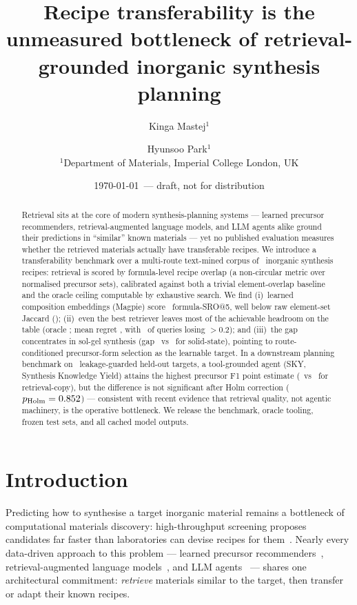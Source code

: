 \documentclass[10pt]{article}
\title{Recipe transferability is the unmeasured bottleneck of
retrieval-grounded inorganic synthesis planning}
\author{%
  Kinga Mastej$^{1}$ \and Hyunsoo Park$^{1}$ \\[4pt]
  \normalsize $^{1}$Department of Materials, Imperial College London, UK \\
  \normalsize \todo{confirm author order, affiliations, and any additional authors}%
}
\date{\today\ --- draft, not for distribution}
\begin{document}
\maketitle

\begin{abstract}
Retrieval sits at the core of modern synthesis-planning systems --- learned
precursor recommenders, retrieval-augmented language models, and LLM agents
alike ground their predictions in ``similar'' known materials --- yet no
published evaluation measures whether the retrieved materials actually have
transferable recipes. We introduce a transferability benchmark over a
multi-route text-mined corpus of \corpusSize\ inorganic synthesis recipes:
retrieval is scored by formula-level recipe overlap (a non-circular metric
over normalised precursor sets), calibrated against both a trivial
element-overlap baseline and the oracle ceiling computable by exhaustive
search. We find (i)~learned composition embeddings (Magpie) score
\magpieFormulaSro\ formula-SRO@5, well below raw element-set Jaccard
(\jaccFormulaSro); (ii)~even the best retriever leaves most of the
achievable headroom on the table (oracle \oracleFormulaSro; mean regret
\jaccMeanRegret, with \jaccFracLargeRegret\ of queries losing $>$0.2);
and (iii)~the gap concentrates in sol-gel synthesis
(gap \gapSolGel\ vs \gapSolidState\ for solid-state), pointing to
route-conditioned precursor-form selection as the learnable target. In a
downstream planning benchmark on \nPlanningCases\ leakage-guarded held-out
targets, a tool-grounded agent (SKY, Synthesis Knowledge Yield) attains the
highest precursor F1 point estimate (\skyFOne\ vs \retrJaccFOne\ for
retrieval-copy), but the difference is not significant after Holm
correction ($p_{\mathrm{Holm}}=0.852$) --- consistent
with recent evidence that retrieval quality, not agentic machinery, is the
operative bottleneck. We release the benchmark, oracle tooling, frozen test
sets, and all cached model outputs.
\end{abstract}

\section{Introduction}

Predicting how to synthesise a target inorganic material remains a
bottleneck of computational materials discovery: high-throughput screening
proposes candidates far faster than laboratories can devise recipes for
them~\cite{jain2013materials,szymanski2023alab}. Nearly every data-driven
approach to this problem --- learned precursor
recommenders~\cite{he2023precursor,noh2024retrievalretro},
retrieval-augmented language models~\cite{iclr2026benchmark}, and LLM
agents~\cite{bran2024chemcrow,boiko2023coscientist} --- shares one
architectural commitment: \emph{retrieve} materials similar to the target,
then transfer or adapt their known recipes.
\end{document}
